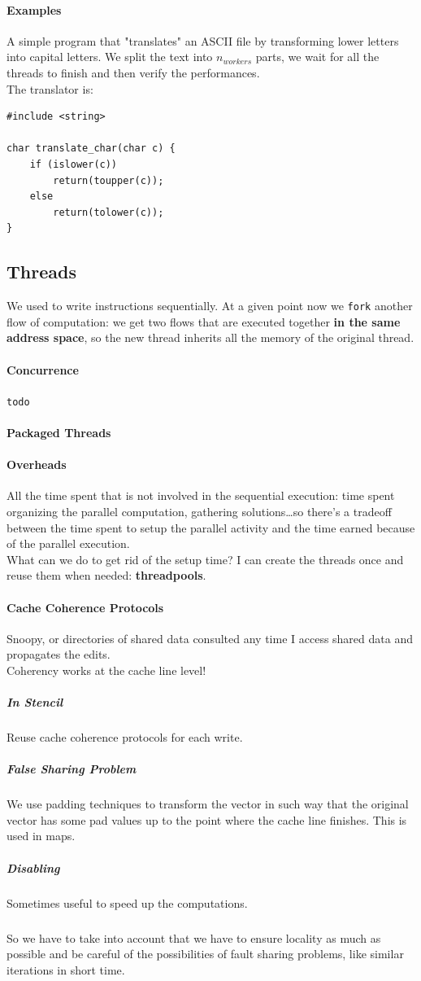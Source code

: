 \documentclass[10pt]{report}
\begin{document}
\paragraph{Examples}
A simple program that "translates" an ASCII file by transforming lower letters into capital letters. We split the text into $n_{workers}$ parts, we wait for all the threads to finish and then verify the performances.
\\The translator is:
\begin{lstlisting}[style=myC]
#include <string>

char translate_char(char c) {
	if (islower(c))
		return(toupper(c));
	else
		return(tolower(c));
}
\end{lstlisting}
\subsection{Threads}
We used to write instructions sequentially. At a given point now we \texttt{fork} another flow of computation: we get two flows that are executed together \textbf{in the same address space}, so the new thread inherits all the memory of the original thread.
\paragraph{Concurrence} \texttt{todo} %
\paragraph{Packaged Threads}
\paragraph{Overheads} %
All the time spent that is not involved in the sequential execution: time spent organizing the parallel computation, gathering solutions\ldots so there's a tradeoff between the time spent to setup the parallel activity and the time earned because of the parallel execution.\\
What can we do to get rid of the setup time? I can create the threads once and reuse them when needed: \textbf{threadpools}.
\paragraph{Cache Coherence Protocols} Snoopy, or directories of shared data consulted any time I access shared data and propagates the edits.\\
Coherency works at the cache line level!
\subparagraph{In Stencil} Reuse cache coherence protocols for each write.
\subparagraph{False Sharing Problem} We use padding techniques to transform the vector in such way that the original vector has some pad values up to the point where the cache line finishes. This is used in maps.
\subparagraph{Disabling} Sometimes useful to speed up the computations.
\subparagraph{} So we have to take into account that we have to ensure locality as much as possible and be careful of the possibilities of fault sharing problems, like similar iterations in short time.
\end{document}
